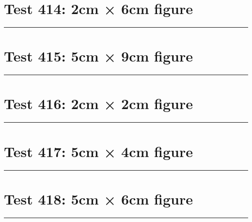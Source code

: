 \documentclass[a4paper,11pt]{article}
\begin{document}
\section*{Test 414: 2cm × 6cm figure}
\begin{swarmwrap}%
  \begin{minipage}[t]{2cm}
    \centering
    \rule{\linewidth}{6cm}
  \end{minipage}%
\end{swarmwrap}%
\swarmwrapnext
\lipsum[37]
\lipsum[38]
\lipsum[39]
\lipsum[40]
\lipsum[41]
\lipsum[42]
\section*{Test 415: 5cm × 9cm figure}
\begin{swarmwrap}%
  \begin{minipage}[t]{5cm}
    \centering
    \rule{\linewidth}{9cm}
  \end{minipage}%
\end{swarmwrap}%
\swarmwrapnext
\lipsum[3]
\lipsum[4]
\lipsum[5]
\lipsum[6]
\lipsum[7]
\lipsum[8]
\section*{Test 416: 2cm × 2cm figure}
\begin{swarmwrap}%
  \begin{minipage}[t]{2cm}
    \centering
    \rule{\linewidth}{2cm}
  \end{minipage}%
\end{swarmwrap}%
\swarmwrapnext
\lipsum[57]
\lipsum[58]
\lipsum[59]
\lipsum[60]
\lipsum[61]
\section*{Test 417: 5cm × 4cm figure}
\begin{swarmwrap}%
  \begin{minipage}[t]{5cm}
    \centering
    \rule{\linewidth}{4cm}
  \end{minipage}%
\end{swarmwrap}%
\swarmwrapnext
\lipsum[30]
\lipsum[31]
\lipsum[32]
\lipsum[33]
\lipsum[34]
\lipsum[35]
\section*{Test 418: 5cm × 6cm figure}
\begin{swarmwrap}%
  \begin{minipage}[t]{5cm}
    \centering
    \rule{\linewidth}{6cm}
  \end{minipage}%
\end{swarmwrap}%
\swarmwrapnext
\lipsum[79]
\lipsum[80]
\lipsum[81]
\lipsum[82]
\end{document}
